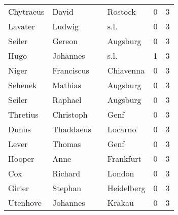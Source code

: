\begin{center}
\begin{tiny}
\begin{longtabu}{llllrr}
                Chytraeus &                              David &             &                                     Rostock &          0 &         3 \\
                  Lavater &                             Ludwig &             &                                        s.l. &          0 &         3 \\
                   Seiler &                             Gereon &             &                                    Augsburg &          0 &         3 \\
                     Hugo &                           Johannes &             &                                        s.l. &          1 &         3 \\
                    Niger &                         Franciscus &             &                                   Chiavenna &          0 &         3 \\
                  Sehenek &                            Mathias &             &                                    Augsburg &          0 &         3 \\
                   Seiler &                            Raphael &             &                                    Augsburg &          0 &         3 \\
                 Thretius &                          Christoph &             &                                        Genf &          0 &         3 \\
                    Dunus &                          Thaddaeus &             &                                     Locarno &          0 &         3 \\
                    Lever &                             Thomas &             &                                        Genf &          0 &         3 \\
                   Hooper &                               Anne &             &                                   Frankfurt &          0 &         3 \\
                      Cox &                            Richard &             &                                      London &          0 &         3 \\
                   Girier &                            Stephan &             &                                  Heidelberg &          0 &         3 \\
                 Utenhove &                           Johannes &             &                                      Krakau &          0 &         3 \\

\end{longtabu}
\end{tiny}
\end{center}
